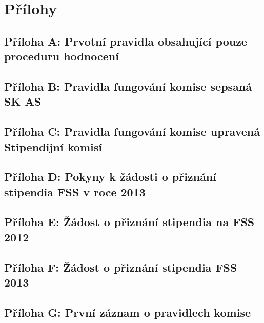 
\chapter{Přílohy}

\cleartoleftpage
\section{Příloha A: Prvotní pravidla obsahující pouze proceduru hodnocení}


\cleartoleftpage
\section{Příloha B: Pravidla fungování komise sepsaná SK AS}


\cleartoleftpage
\section{Příloha C: Pravidla fungování komise upravená Stipendijní komisí}


\cleartoleftpage
\section{Příloha D: Pokyny k žádosti o přiznání stipendia FSS v roce 2013}


\cleartoleftpage
\section{Příloha E: Žádost o přiznání stipendia na FSS 2012}


\cleartoleftpage
\section{Příloha F: Žádost o přiznání stipendia FSS 2013}


\cleartoleftpage
\section{Příloha G: První záznam o pravidlech komise}


